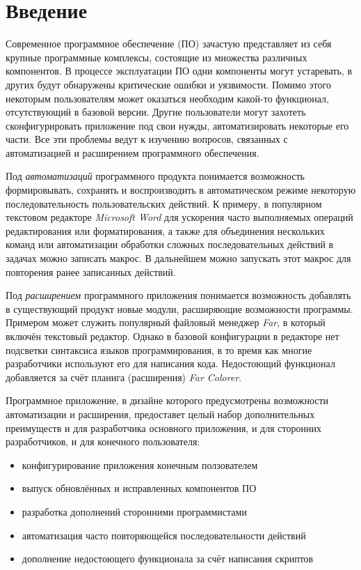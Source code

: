 \setcounter{secnumdepth}{0} %
\section{Введение}
\setcounter{secnumdepth}{2}

Современное программное обеспечение (ПО) зачастую представляет из себя крупные программные комплексы, состоящие из множества различных компонентов. В процессе эксплуатации ПО одни компоненты могут устаревать, в других будут обнаружены критические ошибки и уязвимости. Помимо этого некоторым пользователям может оказаться необходим какой-то функционал, отсутствующий в базовой версии. Другие пользователи могут захотеть сконфигурировать приложение под свои нужды, автоматизировать некоторые его части. Все эти проблемы ведут к изучению вопросов, связанных с автоматизацией и расширением программного обеспечения.

Под {\it автоматизаций} программного продукта понимается возможность формировывать, сохранять и воспроизводить в автоматическом режиме некоторую последовательность пользовательских действий. К примеру, в популярном текстовом редакторе {\it Microsoft Word} для ускорения часто выполняемых операций редактирования или форматирования, а также для объединения нескольких команд или автоматизации обработки сложных последовательных действий в задачах можно записать макрос. В дальнейшем можно запускать этот макрос для повторения ранее записанных действий.

Под {\it расширением} программного приложения понимается возможность добавлять в существующий продукт новые модули, расширяющие возможности программы. Примером может служить популярный файловый менеджер {\it Far}, в который включён текстовый редактор. Однако в базовой конфигурации в редакторе нет подсветки синтаксиса языков программирования, в то время как многие разработчики используют его для написания кода. Недостоющий функционал добавляется за счёт планига (расширения) {\it Far Colorer}. 

Программное приложение, в дизайне которого предусмотрены возможности автоматизации и расширения, предоставет целый набор дополнительных преимуществ и для разработчика основного приложения, и для сторонних разработчиков, и для конечного пользователя:
\begin{itemize}
\item конфигурирование приложения конечным ползователем
\item выпуск обновлённых и исправленных компонентов ПО
\item разработка дополнений сторонними программистами
\item автоматизация часто повторяющейся последовательности действий
\item дополнение недостоющего функционала за счёт написания скриптов
\end{itemize}

